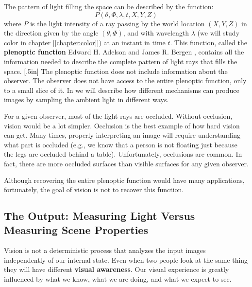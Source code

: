 The pattern of light filling the space can be described by the function:
\begin{equation}
P (\theta, \Phi, \lambda, t, X, Y, Z)
\end{equation}
where $P$ is the light intensity of a ray passing by the world location $(X,Y,Z)$  in the direction given by the angle $(\theta, \Phi)$, and with wavelength $\lambda$ (we will study color in chapter [\ref{chapter:color}])
at an instant in time $t$. This function, called the {\bf plenoptic function} 
Edward H. Adelson  
and James R. Bergen \cite{Adelson91}, contains all the information needed to describe the complete pattern of light rays that fills the space. 
[.5in]
The plenoptic function does not include information about the observer. The observer does not have access to the entire plenoptic function, only to a small slice of it. In \chap{\ref{chapter:imaging}} we will describe how different mechanisms can produce images by sampling the ambient light in different ways.

For a given observer, most of the light rays are occluded. Without occlusion, vision would be a lot simpler. Occlusion is the best example of how hard vision can get. Many times, properly interpreting an image will require understanding what part is occluded (e.g., we know that a person is not floating just because the legs are occluded behind a table). Unfortunately, occlusions are common. In fact, there are more occluded surfaces than visible surfaces for any given observer.  


Although recovering the entire plenoptic function would have many applications, fortunately, the goal of vision is not to recover this function. 




\subsection{The Output: Measuring Light Versus Measuring Scene Properties}

Vision is not a deterministic process that analyzes the input images independently of our internal state. Even when two people look at the same thing they will have different {\bf visual awareness}. Our visual experience is greatly influenced by what we know, what we are doing, and what we expect to see. 

